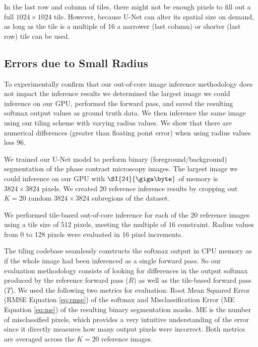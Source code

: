 \documentclass[letterpaper]{article} %
\begin{document}
In the last row and column of tiles, there might not be enough pixels to fill out a full $1024 \times 1024$ tile. However, because U-Net can alter its spatial size on demand, as long as the tile is a multiple of 16 a narrower (last column) or shorter (last row) tile can be used. 


\subsection{Errors due to Small Radius}

To experimentally confirm that our out-of-core image inference methodology does not impact the inference results we determined the largest image we could inference on our GPU, performed the forward pass, and saved the resulting softmax output values as ground truth data. We then inference the same image using our tiling scheme with varying radius values. We show that there are numerical differences (greater than floating point error) when using radius values less 96. 

We trained our U-Net model to perform binary (foreground/background) segmentation of the phase contrast microscopy images. The largest image we could inference on our GPU with $\SI{24}{\giga\byte}$ of memory is $3824 \times 3824$ pixels. We created 20 reference inference results by cropping out $K = 20$ random $3824 \times 3824$ subregions of the dataset. 

We performed tile-based out-of-core inference for each of the 20 reference images using a tile size of 512 pixels, meeting the multiple of 16 constraint. Radius values from 0 to 128 pixels were evaluated in 16 pixel increments. 

The tiling codebase seamlessly constructs the softmax output in CPU memory as if the whole image had been inferenced as a single forward pass. So our evaluation methodology consists of looking for differences in the output softmax produced by the reference forward pass ($R$) as well as the tile-based forward pass ($T$). We used the following two metrics for evaluation: Root Mean Squared Error (RMSE Equation \ref{eq:rmse}) of the softmax and Misclassification Error (ME Equation \ref{eq:me}) of the resulting binary segmentation masks. ME is the number of misclassified pixels, which provides a very intuitive understanding of the error since it directly measures how many output pixels were incorrect. Both metrics are averaged across the $K = 20$ reference images.
\end{document}
